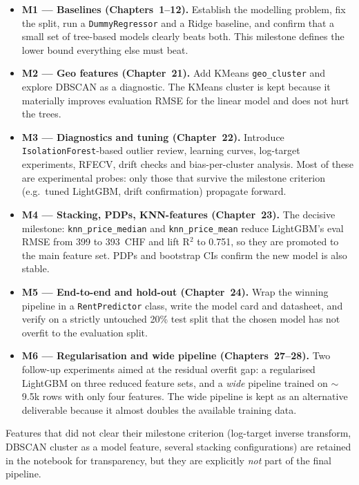 \documentclass[11pt,a4paper]{article}
\begin{document}
\begin{itemize}
    \item \textbf{M1 — Baselines (Chapters~1--12).} Establish the modelling problem, fix the split, run a \texttt{DummyRegressor} and a Ridge baseline, and confirm that a small set of tree-based models clearly beats both. This milestone defines the lower bound everything else must beat.
    \item \textbf{M2 — Geo features (Chapter~21).} Add KMeans \texttt{geo\_cluster} and explore DBSCAN as a diagnostic. The KMeans cluster is kept because it materially improves evaluation RMSE for the linear model and does not hurt the trees.
    \item \textbf{M3 — Diagnostics and tuning (Chapter~22).} Introduce \texttt{IsolationForest}-based outlier review, learning curves, log-target experiments, RFECV, drift checks and bias-per-cluster analysis. Most of these are experimental probes: only those that survive the milestone criterion (e.g.\ tuned LightGBM, drift confirmation) propagate forward.
    \item \textbf{M4 — Stacking, PDPs, KNN-features (Chapter~23).} The decisive milestone: \texttt{knn\_price\_median} and \texttt{knn\_price\_mean} reduce LightGBM's eval RMSE from 399 to 393~CHF and lift R$^2$ to 0.751, so they are promoted to the main feature set. PDPs and bootstrap CIs confirm the new model is also stable.
    \item \textbf{M5 — End-to-end and hold-out (Chapter~24).} Wrap the winning pipeline in a \texttt{RentPredictor} class, write the model card and datasheet, and verify on a strictly untouched 20\% test split that the chosen model has not overfit to the evaluation split.
    \item \textbf{M6 — Regularisation and wide pipeline (Chapters~27--28).} Two follow-up experiments aimed at the residual overfit gap: a regularised LightGBM on three reduced feature sets, and a \emph{wide} pipeline trained on $\sim$9.5k rows with only four features. The wide pipeline is kept as an alternative deliverable because it almost doubles the available training data.
\end{itemize}

Features that did not clear their milestone criterion (log-target inverse transform, DBSCAN cluster as a model feature, several stacking configurations) are retained in the notebook for transparency, but they are explicitly \emph{not} part of the final pipeline.
\end{document}
